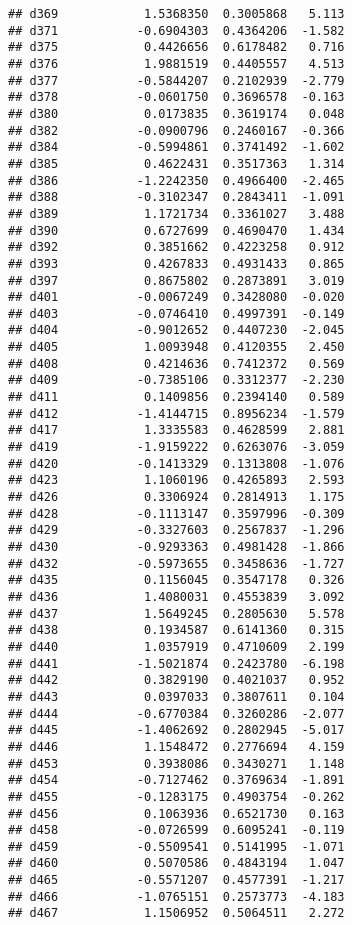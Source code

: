 \documentclass[
]{article}
\begin{document}
\begin{verbatim}
## d369            1.5368350  0.3005868   5.113
## d371           -0.6904303  0.4364206  -1.582
## d375            0.4426656  0.6178482   0.716
## d376            1.9881519  0.4405557   4.513
## d377           -0.5844207  0.2102939  -2.779
## d378           -0.0601750  0.3696578  -0.163
## d380            0.0173835  0.3619174   0.048
## d382           -0.0900796  0.2460167  -0.366
## d384           -0.5994861  0.3741492  -1.602
## d385            0.4622431  0.3517363   1.314
## d386           -1.2242350  0.4966400  -2.465
## d388           -0.3102347  0.2843411  -1.091
## d389            1.1721734  0.3361027   3.488
## d390            0.6727699  0.4690470   1.434
## d392            0.3851662  0.4223258   0.912
## d393            0.4267833  0.4931433   0.865
## d397            0.8675802  0.2873891   3.019
## d401           -0.0067249  0.3428080  -0.020
## d403           -0.0746410  0.4997391  -0.149
## d404           -0.9012652  0.4407230  -2.045
## d405            1.0093948  0.4120355   2.450
## d408            0.4214636  0.7412372   0.569
## d409           -0.7385106  0.3312377  -2.230
## d411            0.1409856  0.2394140   0.589
## d412           -1.4144715  0.8956234  -1.579
## d417            1.3335583  0.4628599   2.881
## d419           -1.9159222  0.6263076  -3.059
## d420           -0.1413329  0.1313808  -1.076
## d423            1.1060196  0.4265893   2.593
## d426            0.3306924  0.2814913   1.175
## d428           -0.1113147  0.3597996  -0.309
## d429           -0.3327603  0.2567837  -1.296
## d430           -0.9293363  0.4981428  -1.866
## d432           -0.5973655  0.3458636  -1.727
## d435            0.1156045  0.3547178   0.326
## d436            1.4080031  0.4553839   3.092
## d437            1.5649245  0.2805630   5.578
## d438            0.1934587  0.6141360   0.315
## d440            1.0357919  0.4710609   2.199
## d441           -1.5021874  0.2423780  -6.198
## d442            0.3829190  0.4021037   0.952
## d443            0.0397033  0.3807611   0.104
## d444           -0.6770384  0.3260286  -2.077
## d445           -1.4062692  0.2802945  -5.017
## d446            1.1548472  0.2776694   4.159
## d453            0.3938086  0.3430271   1.148
## d454           -0.7127462  0.3769634  -1.891
## d455           -0.1283175  0.4903754  -0.262
## d456            0.1063936  0.6521730   0.163
## d458           -0.0726599  0.6095241  -0.119
## d459           -0.5509541  0.5141995  -1.071
## d460            0.5070586  0.4843194   1.047
## d465           -0.5571207  0.4577391  -1.217
## d466           -1.0765151  0.2573773  -4.183
## d467            1.1506952  0.5064511   2.272

\end{verbatim}
\end{document}
